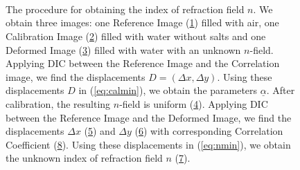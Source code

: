 \documentclass{article}
\begin{document}
\begin{figure}[htbp]
\begin{subfigure}{.5\linewidth}
		\label{fig:air0side}
\end{subfigure}%
\begin{subfigure}{.5\linewidth}
	\label{fig:fresh0side}
\end{subfigure}\\
\begin{subfigure}{.5\linewidth}
		\label{fig:twolayer0side}
\end{subfigure}%
\begin{subfigure}{.5\linewidth}
	\label{fig:ncalibration0side}
\end{subfigure}\\
\begin{subfigure}{.5\linewidth}
		\label{fig:dx0side}
\end{subfigure}%
\begin{subfigure}{.5\linewidth}
		\label{fig:dy0side}
\end{subfigure}\\
\begin{subfigure}{.5\linewidth}
		\label{fig:ndeformed0side}
\end{subfigure}%
\begin{subfigure}{.5\linewidth}
		\label{fig:C0side}
\end{subfigure}
\caption{The procedure for obtaining the index of refraction field $n$. We obtain three images: one Reference Image (\ref{fig:air0side}) filled with air, one Calibration Image (\ref{fig:fresh0side}) filled with water without salts and one Deformed Image (\ref{fig:twolayer0side}) filled with water with an unknown $n$-field. Applying DIC between the Reference Image and the Correlation image, we find the displacements $D=(\Delta x, \Delta y)$. Using these displacements $D$ in (\ref{eq:calmin}), we obtain the parameters $\underline{\alpha}$. After calibration, the resulting $n$-field is uniform (\ref{fig:ncalibration0side}). Applying DIC between the Reference Image and the Deformed Image, we find the displacements $\Delta x$ (\ref{fig:dx0side}) and $\Delta y$ (\ref{fig:dy0side}) with corresponding Correlation Coefficient (\ref{fig:C0side}).  Using these displacements in (\ref{eq:nmin}), we obtain the unknown index of refraction field $n$ (\ref{fig:ndeformed0side}).}
\label{fig:0side}
\end{figure}
\end{document}
